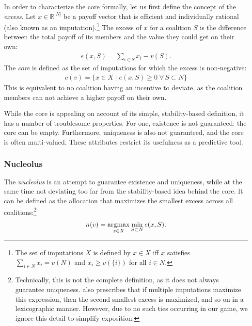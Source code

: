 In order to characterize the core formally, let us first define the concept of the \emph{excess}. Let $x \in \mathbb{R}^{|N|}$ be a payoff vector that is efficient and individually rational (also known as an imputation).\footnote{The set of imputations $X$ is defined by $x \in X$ iff $x$ satisfies $\sum_{i \in N} x_i = v(N)$ and $x_i \geq v(\{i\})$ for all $i \in N$.} The excess of $x$ for a coalition $S$ is the difference between the total payoff of its members and the value they could get on their own:
\begin{align*}
    e(x, S) = \sum_{i \in S} x_i - v(S).
\end{align*}
The \emph{core} is defined as the set of imputations for which the excess is non-negative:
\begin{align*}
    c(v) = \{x \in X \mid e(x, S) \geq 0 \;\forall\, S \subset N\}
\end{align*}
This is equivalent to no coalition having an incentive to deviate, as the coalition members can not achieve a higher payoff on their own.

While the core is appealing on account of its simple, stability-based definition, it has a number of troublesome properties. For one, existence is not guaranteed: the core can be empty. Furthermore, uniqueness is also not guaranteed, and the core is often multi-valued. These attributes restrict its usefulness as a predictive tool.

\subsubsection{Nucleolus}

The \emph{nucleolus} \parencite{schmeidler1969nucleolus} is an attempt to guarantee existence and uniqueness, while at the same time not deviating too far from the stability-based idea behind the core. It can be defined as the allocation that maximizes the smallest excess across all coalitions:\footnote{Technically, this is not the complete definition, as it does not always guarantee uniqueness. \textcite{schmeidler1969nucleolus} also prescribes that if multiple imputations maximize this expression, then the second smallest excess is maximized, and so on in a lexicographic manner. However, due to no such ties occurring in our game, we ignore this detail to simplify exposition.}
\begin{align*}
    n(v) = \operatorname*{argmax}_{x \in X} \min_{S \subset N} e(x, S).
\end{align*}

